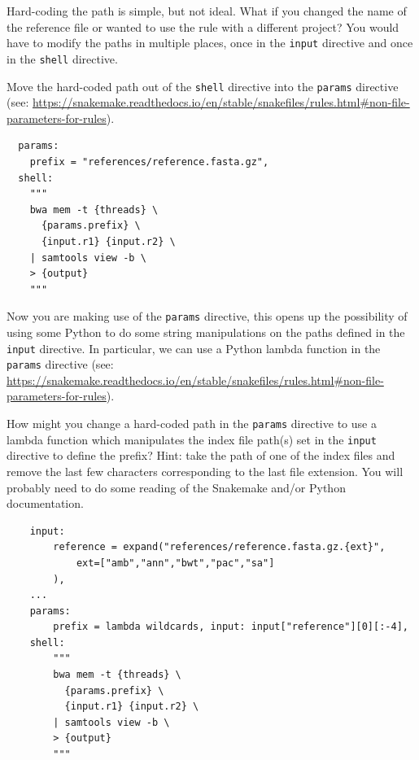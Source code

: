 \begin{questions}

Hard-coding the path is simple, but not ideal. What if you changed the name of the reference file or wanted to use the rule with a
different project? You would have to modify the paths in multiple places, once in the \texttt{input} directive and once in the
\texttt{shell} directive.

Move the hard-coded path out of the \texttt{shell} directive into the \texttt{params} directive
(see: \url{https://snakemake.readthedocs.io/en/stable/snakefiles/rules.html#non-file-parameters-for-rules}).

\begin{answer}

\begin{lstlisting}
  params:
    prefix = "references/reference.fasta.gz",
  shell:
    """
    bwa mem -t {threads} \
      {params.prefix} \
      {input.r1} {input.r2} \
    | samtools view -b \
    > {output}
    """
\end{lstlisting}

\end{answer}

\end{questions}

\begin{questions}

Now you are making use of the \texttt{params} directive, this opens up the possibility of using some Python to do some string manipulations
on the paths defined in the \texttt{input} directive. In particular, we can use a Python lambda function in the \texttt{params} directive
(see: \url{https://snakemake.readthedocs.io/en/stable/snakefiles/rules.html#non-file-parameters-for-rules}).

How might you change a hard-coded path in the \texttt{params} directive to use a lambda function which manipulates the index file path(s) set
in the \texttt{input} directive to define the prefix? Hint: take the path of one of the index files and remove the last few characters
corresponding to the last file extension. You will probably need to do some reading of the Snakemake and/or Python documentation.

\begin{answer}

\begin{lstlisting}
	input:
		reference = expand("references/reference.fasta.gz.{ext}",
			ext=["amb","ann","bwt","pac","sa"]
		),
	...
	params:
		prefix = lambda wildcards, input: input["reference"][0][:-4],
	shell:
		"""
		bwa mem -t {threads} \
		  {params.prefix} \
		  {input.r1} {input.r2} \
		| samtools view -b \
		> {output}
		"""
\end{lstlisting}

\end{answer}

\end{questions}

